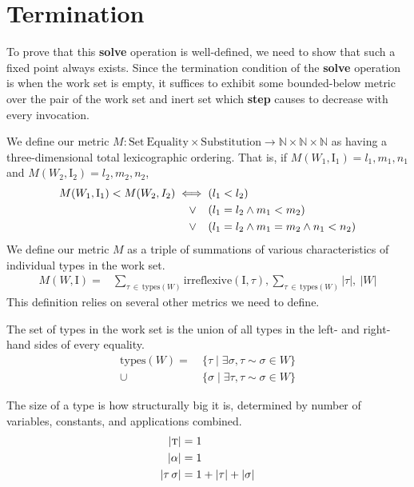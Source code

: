 \documentclass[10pt, letterpaper, oneside]{article}
\newcommand{\inertset}{\text{I}}
\begin{document}
\section{Termination}

To prove that this \textbf{solve} operation is well-defined, we need to show that such a fixed point always exists. Since the termination condition of the \textbf{solve} operation is when the work set is empty, it suffices to exhibit some bounded-below metric over the pair of the work set and inert set which \textbf{step} causes to decrease with every invocation.

We define our metric \(M : \text{Set}~\text{Equality} \times \text{Substitution} \to \mathbb{N} \times \mathbb{N} \times \mathbb{N}\) as having a three-dimensional total lexicographic ordering. That is, if \(M(W_1, \inertset_1) = l_1, m_1, n_1\) and \(M(W_2, \inertset_2) = l_2, m_2, n_2\),
\begin{alignat*}{1}
  M(W_1, \inertset_1) < M(W_2, I_2) \iff (&l_1 < l_2)\\
                   \lor\hspace{1.05em}(&l_1 = l_2 \land m_1 < m_2)\\
                   \lor\hspace{1.05em}(&l_1 = l_2 \land m_1 = m_2 \land n_1 < n_2)
\end{alignat*}
We define our metric \(M\) as a triple of summations of various characteristics of individual types in the work set.
\begin{align*}
  M(W, \inertset) = &\!\!\!\!\!\sum_{\tau\,\in\,\text{types}(W)}\!\!\!\!\!\!\!\!\text{irreflexive}(\inertset, \tau), \!\!\!\!\!\sum_{\tau\,\in\,\text{types}(W)}\!\!\!\!\!\!\!\!|\tau|,\ |W|
\end{align*}
This definition relies on several other metrics we need to define.

The set of types in the work set is the union of all types in the left- and right-hand sides of every equality.
\begin{align*}
  \text{types}(W) =    &~\{\tau \mid \exists \sigma, \tau \sim \sigma \in W \}\\
                  \cup &~\{\sigma \mid \exists \tau, \tau \sim \sigma \in W \}
\end{align*}

The size of a type is how structurally big it is, determined by number of variables, constants, and applications combined.
\begin{align*}
  |\text{\sc t}| &= 1\\
  |\alpha|       &= 1\\
  |\tau\,\sigma| &= 1 + |\tau| + |\sigma|
\end{align*}
\end{document}

